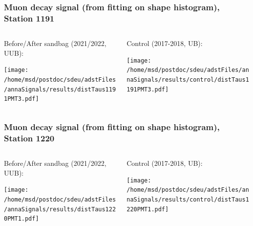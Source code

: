 \documentclass[aspectratio=169]{beamer}
\begin{document}
\begin{frame}
  \frametitle{Muon decay signal (from fitting on shape histogram), Station 1191}
  
  \begin{columns}[T,c]
    \begin{column}{.5\textwidth}
      Before/After sandbag (2021/2022, UUB):
      \vspace{.3cm}

      \texttt{[image: /home/msd/postdoc/sdeu/adstFiles/annaSignals/results/distTaus1191PMT3.pdf]}
    \end{column}
    \begin{column}{.5\textwidth}
      Control (2017-2018, UB):
      \vspace{0.3cm}

      \texttt{[image: /home/msd/postdoc/sdeu/adstFiles/annaSignals/results/control/distTaus1191PMT3.pdf]}
    \end{column}    
\end{columns}
\end{frame}


\begin{frame}
  \frametitle{Muon decay signal (from fitting on shape histogram), Station 1220}
  
  \begin{columns}[T,c]
    \begin{column}{.5\textwidth}
      Before/After sandbag (2021/2022, UUB):
      \vspace{.3cm}

      \texttt{[image: /home/msd/postdoc/sdeu/adstFiles/annaSignals/results/distTaus1220PMT1.pdf]}
    \end{column}
    \begin{column}{.5\textwidth}
      Control (2017-2018, UB):
      \vspace{0.3cm}

      \texttt{[image: /home/msd/postdoc/sdeu/adstFiles/annaSignals/results/control/distTaus1220PMT1.pdf]}
    \end{column}
  \end{columns}
\end{frame}
\end{document}
